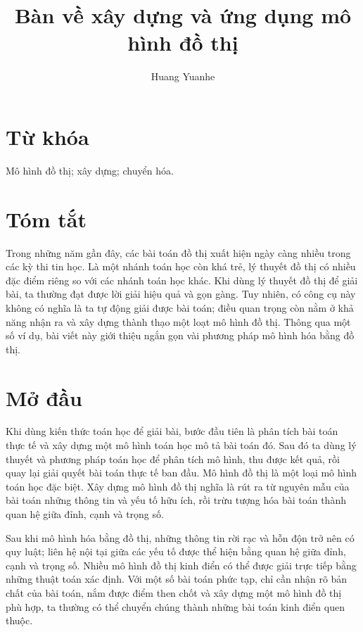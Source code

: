 \documentclass[11pt]{article}
\title{Bàn về xây dựng và ứng dụng mô hình đồ thị}
\author{Huang Yuanhe}
\date{}
\begin{document}
\maketitle


\section*{Từ khóa}

Mô hình đồ thị; xây dựng; chuyển hóa.

\section*{Tóm tắt}

Trong những năm gần đây, các bài toán đồ thị xuất hiện ngày càng nhiều trong
các kỳ thi tin học. Là một nhánh toán học còn khá trẻ, lý thuyết đồ thị có
nhiều đặc điểm riêng so với các nhánh toán học khác. Khi dùng lý thuyết đồ
thị để giải bài, ta thường đạt được lời giải hiệu quả và gọn gàng. Tuy nhiên,
có công cụ này không có nghĩa là ta tự động giải được bài toán; điều quan
trọng còn nằm ở khả năng nhận ra và xây dựng thành thạo một loạt mô hình đồ
thị. Thông qua một số ví dụ, bài viết này giới thiệu ngắn gọn vài phương pháp
mô hình hóa bằng đồ thị.

\section{Mở đầu}

Khi dùng kiến thức toán học để giải bài, bước đầu tiên là phân tích bài toán
thực tế và xây dựng một mô hình toán học mô tả bài toán đó. Sau đó ta dùng lý
thuyết và phương pháp toán học để phân tích mô hình, thu được kết quả, rồi
quay lại giải quyết bài toán thực tế ban đầu. Mô hình đồ thị là một loại mô
hình toán học đặc biệt. Xây dựng mô hình đồ thị nghĩa là rút ra từ nguyên mẫu
của bài toán những thông tin và yếu tố hữu ích, rồi trừu tượng hóa bài toán
thành quan hệ giữa đỉnh, cạnh và trọng số.

Sau khi mô hình hóa bằng đồ thị, những thông tin rời rạc và hỗn độn trở nên
có quy luật; liên hệ nội tại giữa các yếu tố được thể hiện bằng quan hệ giữa
đỉnh, cạnh và trọng số. Nhiều mô hình đồ thị kinh điển có thể được giải trực
tiếp bằng những thuật toán xác định. Với một số bài toán phức tạp, chỉ cần
nhận rõ bản chất của bài toán, nắm được điểm then chốt và xây dựng một mô hình
đồ thị phù hợp, ta thường có thể chuyển chúng thành những bài toán kinh điển
quen thuộc.
\end{document}
